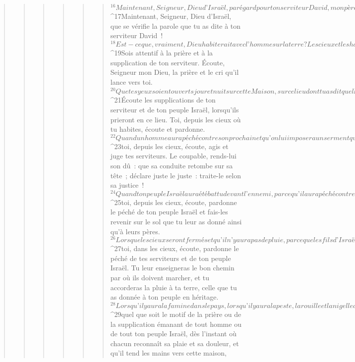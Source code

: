 \begin{verse}
\begin{verse}
\begin{verse}
\begin{verse}
\begin{verse}
\begin{verse}
${}^{16}Maintenant, Seigneur, Dieu d’Israël, par égard pour ton serviteur David, mon père, garde la parole que tu lui avais dite : “Tes descendants qui siégeront sur le trône d’Israël ne seront pas écartés de ma présence, pourvu que tes fils veillent à suivre leur chemin en marchant selon ma Loi, comme tu as marché devant moi.” 
${}^{17}Maintenant, Seigneur, Dieu d’Israël, que se vérifie la parole que tu as dite à ton serviteur David !
${}^{18}Est-ce que, vraiment, Dieu habiterait avec l’homme sur la terre ? Les cieux et les hauteurs des cieux ne peuvent te contenir : encore moins cette Maison que j’ai bâtie ! 
${}^{19}Sois attentif à la prière et à la supplication de ton serviteur. Écoute, Seigneur mon Dieu, la prière et le cri qu’il lance vers toi. 
${}^{20}Que tes yeux soient ouverts jour et nuit sur cette Maison, sur ce lieu dont tu as dit que là tu mettrais ton nom. Écoute donc la prière que ton serviteur fera en ce lieu. 
${}^{21}Écoute les supplications de ton serviteur et de ton peuple Israël, lorsqu’ils prieront en ce lieu. Toi, depuis les cieux où tu habites, écoute et pardonne.
${}^{22}Quand un homme aura péché contre son prochain et qu’on lui imposera un serment qui peut se retourner contre lui, s’il vient à prêter ce serment devant ton autel dans cette Maison, 
${}^{23}toi, depuis les cieux, écoute, agis et juge tes serviteurs. Le coupable, rends-lui son dû : que sa conduite retombe sur sa tête ; déclare juste le juste : traite-le selon sa justice !
${}^{24}Quand ton peuple Israël aura été battu devant l’ennemi, parce qu’il aura péché contre toi, s’il revient et célèbre ton nom, s’il prie et te supplie dans cette Maison, 
${}^{25}toi, depuis les cieux, écoute, pardonne le péché de ton peuple Israël et fais-les revenir sur le sol que tu leur as donné ainsi qu’à leurs pères.
${}^{26}Lorsque les cieux seront fermés et qu’il n’y aura pas de pluie, parce que les fils d’Israël auront péché contre toi, s’ils prient vers ce lieu et célèbrent ton nom, s’ils se détournent de leur péché, parce que tu les auras humiliés, 
${}^{27}toi, dans les cieux, écoute, pardonne le péché de tes serviteurs et de ton peuple Israël. Tu leur enseigneras le bon chemin par où ils doivent marcher, et tu accorderas la pluie à ta terre, celle que tu as donnée à ton peuple en héritage.
${}^{28}Lorsqu’il y aura la famine dans le pays, lorsqu’il y aura la peste, la rouille et la nigelle du blé, les sauterelles et les criquets, lorsque son ennemi assiégera une ville dans le pays, en tout fléau, en toute maladie, 
${}^{29}quel que soit le motif de la prière ou de la supplication émanant de tout homme ou de tout ton peuple Israël, dès l’instant où chacun reconnaît sa plaie et sa douleur, et qu’il tend les mains vers cette maison, 

\end{verse}
\end{verse}
\end{verse}
\end{verse}
\end{verse}
\end{verse}
